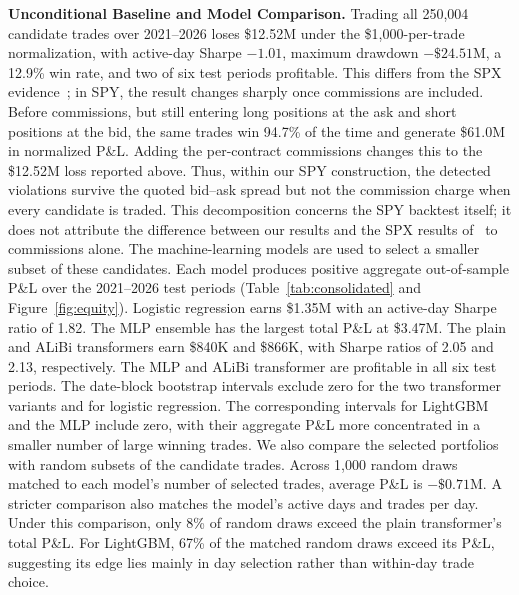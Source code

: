 \documentclass[sigconf,review,anonymous]{acmart}
\begin{document}
\smallskip\noindent\textbf{Unconditional Baseline and Model Comparison.}
Trading all 250{,}004 candidate trades over 2021--2026 loses \$12.52M under the \$1{,}000-per-trade normalization, with active-day Sharpe $-1.01$, maximum drawdown $-\$24.51$M, a 12.9\% win rate, and two of six test periods profitable.
This differs from the SPX evidence~\cite{glasserman2025tp2}; in SPY, the result changes sharply once commissions are included. Before commissions, but still entering long positions at the ask and short positions at the bid, the same trades win 94.7\% of the time and generate \$61.0M in normalized P\&L. Adding the per-contract commissions changes this to the \$12.52M loss reported above. Thus, within our SPY construction, the detected violations survive the quoted bid--ask spread but not the commission charge when every candidate is traded. This decomposition concerns the SPY backtest itself; it does not attribute the difference between our results and the SPX results of~\cite{glasserman2025tp2} to commissions alone.
The machine-learning models are used to select a smaller subset of these candidates. Each model produces positive aggregate out-of-sample P\&L over the 2021--2026 test periods (Table~\ref{tab:consolidated} and Figure~\ref{fig:equity}). Logistic regression earns \$1.35M with an active-day Sharpe ratio of 1.82. The MLP ensemble has the largest total P\&L at \$3.47M. The plain and ALiBi transformers earn \$840K and \$866K, with Sharpe ratios of 2.05 and 2.13, respectively. The MLP and ALiBi transformer are profitable in all six test periods.
The date-block bootstrap intervals exclude zero for the two transformer variants and for logistic regression. The corresponding intervals for LightGBM and the MLP include zero, with their aggregate P\&L more concentrated in a smaller number of large winning trades.
We also compare the selected portfolios with random subsets of the candidate trades. Across 1{,}000 random draws matched to each model's number of selected trades, average P\&L is $-\$0.71$M. A stricter comparison also matches the model's active days and trades per day. Under this comparison, only 8\% of random draws exceed the plain transformer's total P\&L. For LightGBM, 67\% of the matched random draws exceed its P\&L, suggesting its edge lies mainly in day selection rather than within-day trade choice.
\end{document}
